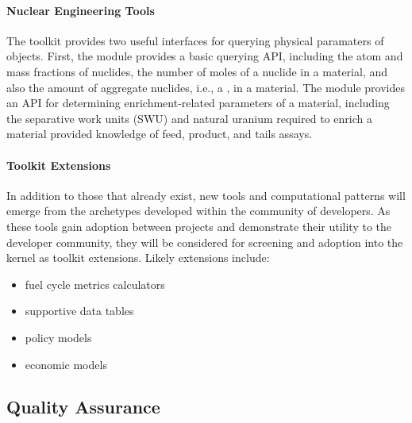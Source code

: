 \paragraph{Nuclear Engineering Tools}

The \Cyclus toolkit provides two useful interfaces for querying physical paramaters of 
objects. First, the  module
provides a basic querying \gls{API}, including the atom and mass fractions of
nuclides, the number of moles of a nuclide in a material, and also the amount of
aggregate nuclides, i.e., a , in a material. The
 module provides an \gls{API} for determining enrichment-related
parameters of a material, including the separative work units (SWU) and natural
uranium required to enrich a material provided knowledge of feed, product, and tails
assays.

\paragraph{Toolkit Extensions}

In addition to those that already exist, new tools and computational patterns will 
emerge from the archetypes developed within the community of 
developers. As these tools gain adoption between projects and demonstrate their 
utility to the developer community, they will be considered for screening and 
adoption into the kernel as toolkit extensions. Likely extensions include:

\begin{itemize}
\item fuel cycle metrics calculators
\item supportive data tables
\item policy models
\item economic models
\end{itemize}

\subsection{Quality Assurance}
%

%

